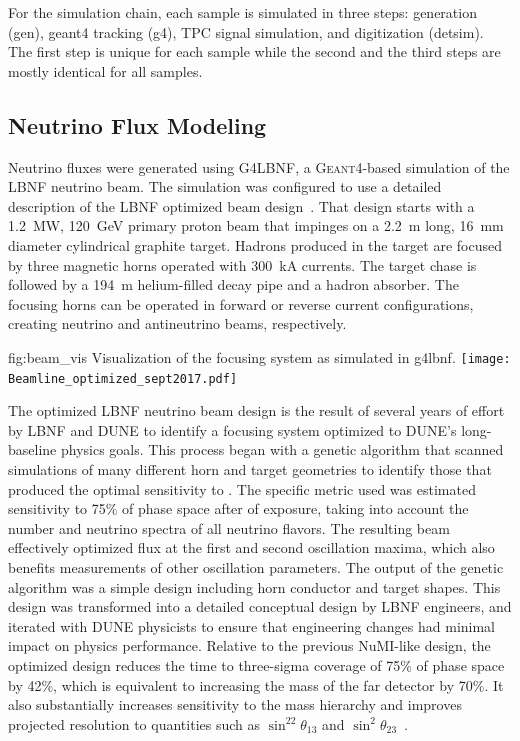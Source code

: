 For the simulation chain, each sample is simulated in three steps: generation (gen), {\sc geant4} tracking (g4), TPC signal simulation, and digitization (detsim). The first step is unique for each sample while the second and the third steps are mostly identical for all samples. 

\subsection{Neutrino Flux Modeling}
\label{sec:tools-mc-flux}

Neutrino fluxes were generated using G4LBNF, a \textsc{Geant}4\xspace-based simulation of the LBNF neutrino beam.  The simulation was configured to use a detailed description of the LBNF optimized beam design~\cite{optimizedbeamcdr}.  That design starts with a \SI{1.2}{MW}, \SI{120}{\GeV} primary proton beam that impinges on a \SI{2.2}{m} long, \SI{16}{mm} diameter cylindrical graphite target.  Hadrons produced in the target are focused by three magnetic horns operated with \SI{300}{kA} currents.  The target chase is followed by a \SI{194}{m} helium-filled decay pipe and a hadron absorber.  The focusing horns can be operated in forward or reverse current configurations, creating neutrino and antineutrino beams, respectively.   

\begin{dunefigure}{fig:beam_vis}
{Visualization of the focusing system as simulated in g4lbnf.}
    \texttt{[image: Beamline\_optimized\_sept2017.pdf]}\end{dunefigure}


The optimized LBNF neutrino beam design is the result of several years of effort by LBNF and DUNE to identify a focusing system optimized to DUNE's long-baseline physics goals.  This process began with a genetic algorithm that scanned simulations of many different horn and target geometries to identify those that produced the optimal sensitivity to .  The specific metric used was estimated sensitivity to 75\% of  phase space after   %
of exposure, taking into account the number and neutrino spectra of all neutrino flavors. The resulting beam effectively optimized flux at the first and second oscillation maxima, which also benefits measurements of other oscillation parameters.  The output of the genetic algorithm was a simple design including horn conductor and target shapes.  This design was transformed into a detailed conceptual design by LBNF engineers, and iterated with DUNE physicists to ensure that engineering changes had minimal impact on physics performance.  Relative to the previous NuMI-like design, the optimized design reduces the time to three-sigma coverage of 75\% of  phase space by 42\%, which is equivalent to increasing the mass of the far detector by 70\%.  It also substantially increases sensitivity to the mass hierarchy and improves projected resolution to quantities such as $\sin^22\theta_{13}$ and $\sin^2\theta_{23}$~\cite{fields_doc_2901}.        

